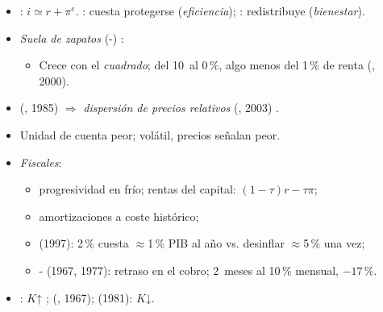 \documentclass{article}
\begin{document}
\begin{columnas}
\begin{itemize}
\item {}: $i\simeq r+\pi^e$. : cuesta protegerse (\emph{eficiencia}); : redistribuye (\emph{bienestar}).
\end{itemize}
\begin{itemize}
\item \emph{Suela de zapatos} (-) :
  \begin{itemize}
  \item Crece con el \emph{cuadrado}; del 10~al 0\,\%, algo menos del 1\,\% de renta (, 2000).
  \end{itemize}
\end{itemize}
\begin{itemize}
\item {} (, 1985) $\Rightarrow$ \emph{dispersión de precios relativos} (, 2003) .
\item Unidad de cuenta peor; volátil, precios señalan peor.
\item \emph{Fiscales}:
  \begin{itemize}
  \item progresividad en frío; rentas del capital: $(1-\tau)r-\tau\pi$;
  \item amortizaciones a coste histórico;
  \item {} (1997): 2\,\% cuesta $\approx$1\,\% PIB al año vs. desinflar $\approx$5\,\% una vez;
  \item {}- (1967, 1977): retraso en el cobro; 2~meses al 10\,\% mensual, $-17$\,\%.
  \end{itemize}
\end{itemize}
\begin{itemize}
\item {}: $K$↑ ;  (, 1967);  (1981): $K$↓.

\end{itemize}
\end{columnas}
\end{document}
